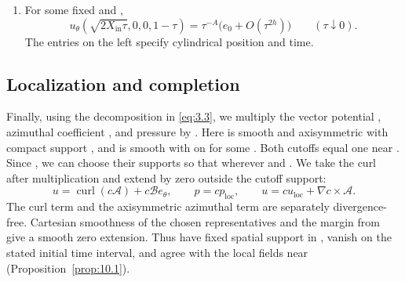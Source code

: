 \begin{theorem}
\begin{enumerate}[label=\textup{(\roman*)},leftmargin=*]
%
In this statement the second argument of  is
; when written as  below, the same field
is evaluated at .

\item For some fixed  and
,
\begin{equation}
u_\theta(\sqrt{2X_{\mathrm{in}}\tau},0,0,1-\tau)
=\tau^{-A}\bigl(e_0+O(\tau^{2h})\bigr)
\qquad(\tau\downarrow0).
\tag{3.6}\label{eq:3.6}
\end{equation}
The entries on the left specify cylindrical position and time.
\end{enumerate}
\end{theorem}

\subsection{Localization and completion}\label{sec:3.5}
Finally, using the decomposition in \eqref{eq:3.3}, we multiply the
vector potential , azimuthal coefficient
, and pressure  by
. Here  is smooth
and axisymmetric with compact support , and
 is smooth with  on
 for some . Both cutoffs equal one near
. Since , we can
choose their supports so that  wherever
 and . We take the curl after
multiplication and extend by zero outside the cutoff support:
\[
u=\operatorname{curl}(c\mathcal A)+c\mathcal B e_\theta,
\qquad p=cp_{\mathrm{loc}},
\qquad
u=cu_{\mathrm{loc}}+\nabla c\times\mathcal A.
\]
The curl term and the axisymmetric azimuthal term are separately divergence-free. Cartesian
smoothness of the chosen representatives and the margin from  give a smooth zero
extension. Thus  have fixed spatial support in
, vanish on the stated initial time interval,
and agree with the local fields near  (Proposition~\ref{prop:10.1}).

